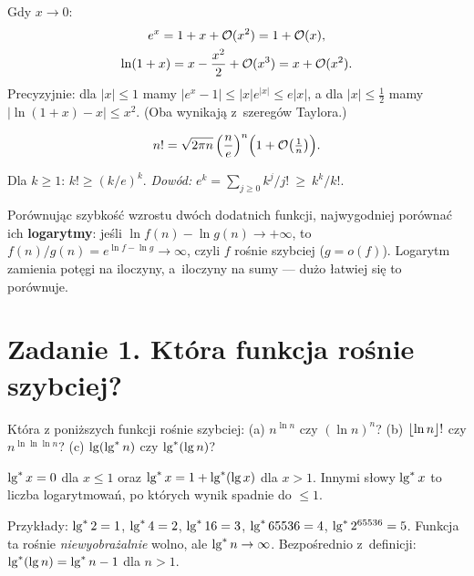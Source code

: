 \documentclass[11pt]{article}
\begin{document}
\begin{fakt}\label{fakt:rozw}
Gdy $x\to 0$:
\begin{gather*}
e^{x} = 1 + x + \mathcal{O}(x^2) = 1+\mathcal{O}(x),\\
\ln(1+x) = x - \frac{x^2}{2} + \mathcal{O}(x^3) = x+\mathcal{O}(x^2).
\end{gather*}
Precyzyjnie: dla $|x|\le 1$ mamy $|e^x-1|\le |x|e^{|x|}\le e|x|$, a dla
$|x|\le\frac12$ mamy $|\ln(1+x)-x|\le x^2$. (Oba wynikają z~szeregów Taylora.)
\end{fakt}

\begin{twierdzenie}\label{tw:stirling}
\[
n! = \sqrt{2\pi n}\,\Bigl(\frac{n}{e}\Bigr)^{n}\Bigl(1+\mathcal{O}\bigl(\tfrac1n\bigr)\Bigr).
\]
\end{twierdzenie}

\begin{fakt}\label{fakt:silnia}
Dla $k\ge 1$: $k!\ge (k/e)^k$. \emph{Dowód:} $e^k=\sum_{j\ge0}k^j/j!\ \ge\ k^k/k!$.
\end{fakt}

\begin{intuicja}
Porównując szybkość wzrostu dwóch dodatnich funkcji, najwygodniej porównać ich
\textbf{logarytmy}: jeśli $\ln f(n) - \ln g(n)\to+\infty$, to
$f(n)/g(n) = e^{\ln f - \ln g}\to\infty$, czyli $f$ rośnie szybciej
($g=o(f)$). Logarytm zamienia potęgi na iloczyny, a~iloczyny na sumy --- dużo
łatwiej się to porównuje.
\end{intuicja}

\section{Zadanie 1. Która funkcja rośnie szybciej?}
\begin{tresc}
Która z poniższych funkcji rośnie szybciej:
(a) $n^{\ln n}$ czy $(\ln n)^n$?\quad
(b) $\left\lfloor \ln n \right\rfloor!$ czy $n^{\ln\ln\ln n}$?\quad
(c) $\operatorname{lg}(\operatorname{lg}^{*} n)$ czy $\operatorname{lg}^{*}(\operatorname{lg} n)$?
\end{tresc}

\begin{teoria}
\begin{definicja}
$\operatorname{lg}^{*} x = 0$ dla $x\le 1$ oraz $\operatorname{lg}^{*} x = 1+\operatorname{lg}^{*}(\operatorname{lg} x)$ dla $x>1$. Innymi słowy
$\operatorname{lg}^{*} x$ to liczba logarytmowań, po których wynik spadnie do $\le 1$.
\end{definicja}
Przykłady: $\operatorname{lg}^{*} 2=1$, $\operatorname{lg}^{*} 4=2$, $\operatorname{lg}^{*} 16=3$, $\operatorname{lg}^{*} 65536=4$,
$\operatorname{lg}^{*} 2^{65536}=5$. Funkcja ta rośnie \emph{niewyobrażalnie} wolno, ale
$\operatorname{lg}^{*} n\to\infty$. Bezpośrednio z~definicji: $\operatorname{lg}^{*}(\operatorname{lg} n)=\operatorname{lg}^{*} n-1$ dla $n>1$.
\end{teoria}
\end{document}
